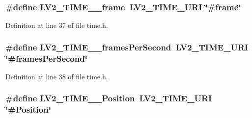 \subsubsection[{\texorpdfstring{L\+V2\+\_\+\+T\+I\+M\+E\+\_\+\+\_\+frame}{LV2_TIME__frame}}]{\setlength{\rightskip}{0pt plus 5cm}\#define L\+V2\+\_\+\+T\+I\+M\+E\+\_\+\+\_\+frame~{\bf L\+V2\+\_\+\+T\+I\+M\+E\+\_\+\+U\+RI} \char`\"{}\#frame\char`\"{}}\hypertarget{lib-src_2lv2_2lv2_2lv2_2lv2plug_8in_2ns_2ext_2time_2time_8h_a7584eb2ee3fc618333db66ffb8ad9882}{}\label{lib-src_2lv2_2lv2_2lv2_2lv2plug_8in_2ns_2ext_2time_2time_8h_a7584eb2ee3fc618333db66ffb8ad9882}


Definition at line 37 of file time.\+h.

\subsubsection[{\texorpdfstring{L\+V2\+\_\+\+T\+I\+M\+E\+\_\+\+\_\+frames\+Per\+Second}{LV2_TIME__framesPerSecond}}]{\setlength{\rightskip}{0pt plus 5cm}\#define L\+V2\+\_\+\+T\+I\+M\+E\+\_\+\+\_\+frames\+Per\+Second~{\bf L\+V2\+\_\+\+T\+I\+M\+E\+\_\+\+U\+RI} \char`\"{}\#frames\+Per\+Second\char`\"{}}\hypertarget{lib-src_2lv2_2lv2_2lv2_2lv2plug_8in_2ns_2ext_2time_2time_8h_a214cd5b82bff723b9d501a9a11eef049}{}\label{lib-src_2lv2_2lv2_2lv2_2lv2plug_8in_2ns_2ext_2time_2time_8h_a214cd5b82bff723b9d501a9a11eef049}


Definition at line 38 of file time.\+h.

\subsubsection[{\texorpdfstring{L\+V2\+\_\+\+T\+I\+M\+E\+\_\+\+\_\+\+Position}{LV2_TIME__Position}}]{\setlength{\rightskip}{0pt plus 5cm}\#define L\+V2\+\_\+\+T\+I\+M\+E\+\_\+\+\_\+\+Position~{\bf L\+V2\+\_\+\+T\+I\+M\+E\+\_\+\+U\+RI} \char`\"{}\#Position\char`\"{}}\hypertarget{lib-src_2lv2_2lv2_2lv2_2lv2plug_8in_2ns_2ext_2time_2time_8h_a9ad92407ea1d703510f8035c32dc7ccb}{}\label{lib-src_2lv2_2lv2_2lv2_2lv2plug_8in_2ns_2ext_2time_2time_8h_a9ad92407ea1d703510f8035c32dc7ccb}


